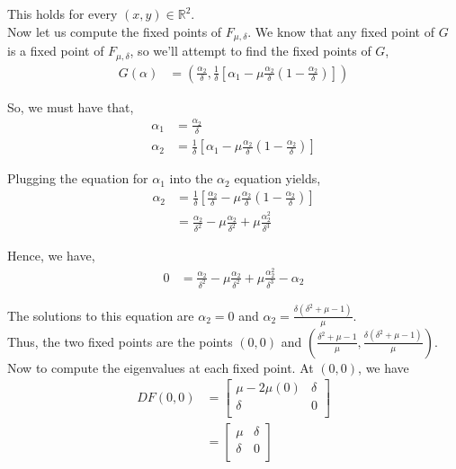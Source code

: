 \documentclass[12pt]{article}
\begin{document}
This holds for every $(x, y) \in \mathbb{R}^2$.\\

Now let us compute the fixed points of $F_{\mu, \delta}$. We know that any fixed point of $G$ is a fixed point of $F_{\mu, \delta}$, so we'll attempt to find the fixed points of $G$,
\begin{align*}
G(\alpha) &= (\frac{\alpha_2}{\delta}, \frac{1}{\delta}[\alpha_1 - \mu\frac{\alpha_2}{\delta}(1 - \frac{\alpha_2}{\delta})])
\end{align*}

So, we must have that,
\begin{align*}
\alpha_1 &= \frac{\alpha_2}{\delta}\\
\alpha_2 &= \frac{1}{\delta}[\alpha_1 - \mu\frac{\alpha_2}{\delta}(1 - \frac{\alpha_2}{\delta})]
\end{align*}

Plugging the equation for $\alpha_1$ into the $\alpha_2$ equation yields,
\begin{align*}
\alpha_2 &= \frac{1}{\delta}[\frac{\alpha_2}{\delta} - \mu\frac{\alpha_2}{\delta}(1 - \frac{\alpha_2}{\delta})]\\
&= \frac{\alpha_2}{\delta^2} - \mu \frac{\alpha_2}{\delta^2} + \mu \frac{\alpha_2^2}{\delta^3}
\end{align*}

Hence, we have,
\begin{align*}
0 &= \frac{\alpha_2}{\delta^2} - \mu \frac{\alpha_2}{\delta^2} + \mu \frac{\alpha_2^2}{\delta^3} - \alpha_2
\end{align*}

The solutions to this equation are $\alpha_2 = 0$ and $\alpha_2 = \frac{\delta(\delta^2 + \mu - 1)}{\mu}$.\\

Thus, the two fixed points are the points $(0, 0)$ and $(\frac{\delta^2 + \mu - 1}{\mu}, \frac{\delta(\delta^2 + \mu - 1)}{\mu})$.\\

Now to compute the eigenvalues at each fixed point. At $(0, 0)$, we have
\begin{align*}
DF(0, 0) &= \begin{bmatrix} 
\mu - 2\mu (0) & \delta\\
\delta & 0\\
\end{bmatrix}\\
&= \begin{bmatrix} 
\mu & \delta\\
\delta & 0\\
\end{bmatrix}
\end{align*}
\end{document}

